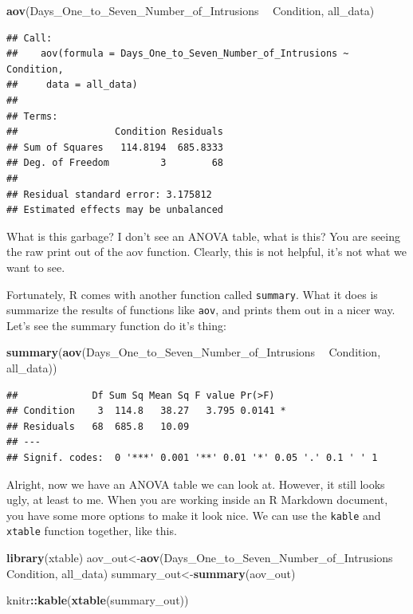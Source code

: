 \documentclass[]{book}
\newenvironment{Shaded}{\begin{snugshade}}{\end{snugshade}}
\newcommand{\KeywordTok}[1]{\textcolor[rgb]{0.13,0.29,0.53}{\textbf{#1}}}
\newcommand{\StringTok}[1]{\textcolor[rgb]{0.31,0.60,0.02}{#1}}
\newcommand{\OperatorTok}[1]{\textcolor[rgb]{0.81,0.36,0.00}{\textbf{#1}}}
\newcommand{\NormalTok}[1]{#1}
\begin{document}
\begin{Shaded}
\begin{Highlighting}[]
\KeywordTok{aov}\NormalTok{(Days_One_to_Seven_Number_of_Intrusions }\OperatorTok{~}\StringTok{ }\NormalTok{Condition, all_data)}
\end{Highlighting}
\end{Shaded}

\begin{verbatim}
## Call:
##    aov(formula = Days_One_to_Seven_Number_of_Intrusions ~ Condition, 
##     data = all_data)
## 
## Terms:
##                 Condition Residuals
## Sum of Squares   114.8194  685.8333
## Deg. of Freedom         3        68
## 
## Residual standard error: 3.175812
## Estimated effects may be unbalanced
\end{verbatim}

What is this garbage? I don't see an ANOVA table, what is this? You are
seeing the raw print out of the aov function. Clearly, this is not
helpful, it's not what we want to see.

Fortunately, R comes with another function called \texttt{summary}. What
it does is summarize the results of functions like \texttt{aov}, and
prints them out in a nicer way. Let's see the summary function do it's
thing:

\begin{Shaded}
\begin{Highlighting}[]
\KeywordTok{summary}\NormalTok{(}\KeywordTok{aov}\NormalTok{(Days_One_to_Seven_Number_of_Intrusions }\OperatorTok{~}\StringTok{ }\NormalTok{Condition, all_data))}
\end{Highlighting}
\end{Shaded}

\begin{verbatim}
##             Df Sum Sq Mean Sq F value Pr(>F)  
## Condition    3  114.8   38.27   3.795 0.0141 *
## Residuals   68  685.8   10.09                 
## ---
## Signif. codes:  0 '***' 0.001 '**' 0.01 '*' 0.05 '.' 0.1 ' ' 1
\end{verbatim}

Alright, now we have an ANOVA table we can look at. However, it still
looks ugly, at least to me. When you are working inside an R Markdown
document, you have some more options to make it look nice. We can use
the \texttt{kable} and \texttt{xtable} function together, like this.

\begin{Shaded}
\begin{Highlighting}[]
\KeywordTok{library}\NormalTok{(xtable)}
\NormalTok{aov_out<-}\KeywordTok{aov}\NormalTok{(Days_One_to_Seven_Number_of_Intrusions }\OperatorTok{~}\StringTok{ }\NormalTok{Condition, all_data)}
\NormalTok{summary_out<-}\KeywordTok{summary}\NormalTok{(aov_out)}

\NormalTok{knitr}\OperatorTok{::}\KeywordTok{kable}\NormalTok{(}\KeywordTok{xtable}\NormalTok{(summary_out))}
\end{Highlighting}
\end{Shaded}
\end{document}
